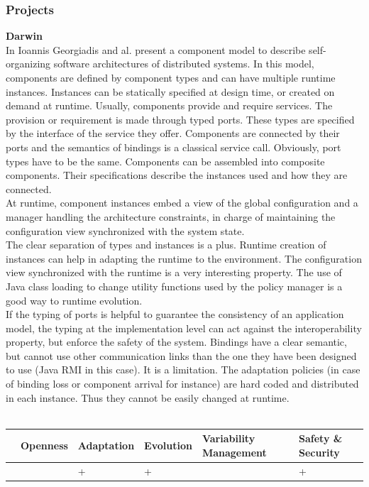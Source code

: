 \vspace{0.3cm}
\subsubsection{Projects}

{\bf Darwin}\\

In \cite{Georgiadis:2002} Ioannis Georgiadis and al. present a component model to describe self-organizing software architectures of distributed systems. In this model, components are defined by component types and can have multiple runtime instances. Instances can be statically specified at design time, or created on demand at runtime.
Usually, components provide and require services. The provision or requirement is made through typed ports. These types are specified by the interface of the service they offer.
Components are connected by their ports and the semantics of bindings is a classical service call. Obviously, port types have to be the same. Components can be assembled into composite components. Their specifications describe the instances used and how they are connected.\\
At runtime, component instances embed a view of the global configuration and a manager handling the architecture constraints, in charge of maintaining the configuration view synchronized with the system state.\\

The clear separation of types and instances is a plus. Runtime creation of instances can help in adapting the runtime to the environment. The configuration view synchronized with the runtime is a very interesting property. The use of Java class loading to change utility functions used by the policy manager is a good way to runtime evolution.\\
If the typing of ports is helpful to guarantee the consistency of an application model, the typing at the implementation level can act against the interoperability property, but enforce the safety of the system. Bindings have a clear semantic, but cannot use other communication links than the one they have been designed to use (Java RMI in this case). It is a limitation. The adaptation policies (in case of binding loss or component arrival for instance) are hard coded and distributed in each instance. Thus they cannot be easily changed at runtime.\\
\\
\begin{tabular}{ >{\centering}m{}| >{\centering}m{} >{\centering}m{}| >{\centering}m{} >{\centering}m{}| >{\centering\arraybackslash}m{}}
{\tiny Interoperability} & {\tiny Openness} & {\tiny Adaptation} & {\tiny Evolution} & {\tiny Variability Management} & {\tiny Safety \& Security}\\
 \hline
  &  & + & + &  & + \\ 
  \hline
\end{tabular}\\

